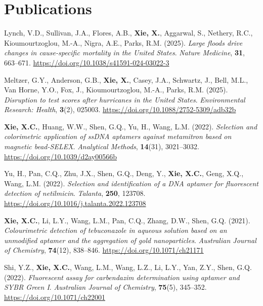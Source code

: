 \documentclass[11pt,a4paper,sans]{moderncv}
\begin{document}
\section{Publications}

\noindent Lynch, V.D., Sullivan, J.A., Flores, A.B., \textbf{Xie, X.}, Aggarwal, S., Nethery, R.C., Kioumourtzoglou, M.-A., Nigra, A.E., Parks, R.M. (2025). \textit{Large floods drive changes in cause-specific mortality in the United States}. \textit{Nature Medicine}, \textbf{31}, 663–671. \href{https://doi.org/10.1038/s41591-024-03022-3}{https://doi.org/10.1038/s41591-024-03022-3}

\medskip

\noindent Meltzer, G.Y., Anderson, G.B., \textbf{Xie, X.}, Casey, J.A., Schwartz, J., Bell, M.L., Van Horne, Y.O., Fox, J., Kioumourtzoglou, M.-A., Parks, R.M. (2025). \textit{Disruption to test scores after hurricanes in the United States}. \textit{Environmental Research: Health}, \textbf{3}(2), 025003. \href{https://doi.org/10.1088/2752-5309/adb32b}{https://doi.org/10.1088/2752-5309/adb32b}

\medskip

\noindent \textbf{Xie, X.C.}, Huang, W.W., Shen, G.Q., Yu, H., Wang, L.M. (2022). \textit{Selection and colorimetric application of ssDNA aptamers against metamitron based on magnetic bead-SELEX}. \textit{Analytical Methods}, \textbf{14}(31), 3021–3032. \href{https://doi.org/10.1039/d2ay00566b}{https://doi.org/10.1039/d2ay00566b}

\medskip

\noindent Yu, H., Pan, C.Q., Zhu, J.X., Shen, G.Q., Deng, Y., \textbf{Xie, X.C.}, Geng, X.Q., Wang, L.M. (2022). \textit{Selection and identification of a DNA aptamer for fluorescent detection of netilmicin}. \textit{Talanta}, \textbf{250}, 123708. \href{https://doi.org/10.1016/j.talanta.2022.123708}{https://doi.org/10.1016/j.talanta.2022.123708}

\medskip

\noindent \textbf{Xie, X.C.}, Li, L.Y., Wang, L.M., Pan, C.Q., Zhang, D.W., Shen, G.Q. (2021). \textit{Colourimetric detection of tebuconazole in aqueous solution based on an unmodified aptamer and the aggregation of gold nanoparticles}. \textit{Australian Journal of Chemistry}, \textbf{74}(12), 838–846. \href{https://doi.org/10.1071/ch21171}{https://doi.org/10.1071/ch21171}

\medskip

\noindent Shi, Y.Z., \textbf{Xie, X.C.}, Wang, L.M., Wang, L.Z., Li, L.Y., Yan, Z.Y., Shen, G.Q. (2022). \textit{Fluorescent assay for carbendazim determination using aptamer and SYBR Green I}. \textit{Australian Journal of Chemistry}, \textbf{75}(5), 345–352. \href{https://doi.org/10.1071/ch22001}{https://doi.org/10.1071/ch22001}
\end{document}
